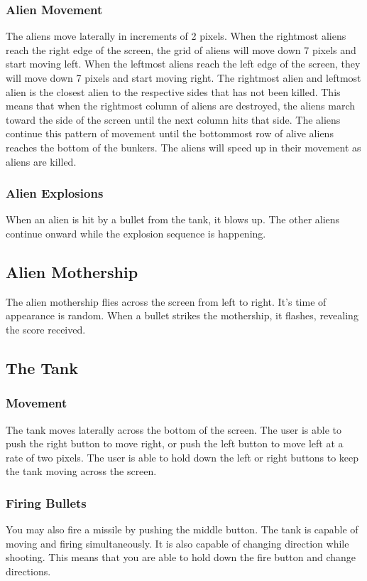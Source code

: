\documentclass[11pt,letter,oneside]{report}
\begin{document}
\subsubsection{Alien Movement}
The aliens move laterally in increments of 2 pixels.  When the rightmost aliens reach the right edge of the screen, the grid of aliens will move down 7 pixels and start moving left.  When the leftmost aliens reach the left edge of the screen, they will move down 7 pixels and start moving right.  The rightmost alien and leftmost alien is the closest alien to the respective sides that has not been killed. This means that when the rightmost column of aliens are destroyed, the aliens march toward the side of the screen until the next column hits that side. The aliens continue this pattern of movement until the bottommost row of alive aliens reaches the bottom of the bunkers. The aliens will speed up in their movement as aliens are killed.

\subsubsection{Alien Explosions}
When an alien is hit by a bullet from the tank, it blows up.  The other aliens continue onward while the explosion sequence is happening.

\subsection{Alien Mothership}
The alien mothership flies across the screen from left to right. It's time of appearance is random. When a bullet strikes the mothership, it flashes, revealing the score received.

\subsection{The Tank}
\subsubsection{Movement}
The tank moves laterally across the bottom of the screen. The user is able to push the right button to move right, or push the left button to move left at a rate of two pixels. The user is able to hold down the left or right buttons to keep the tank moving across the screen.
\subsubsection{Firing Bullets}
You may also fire a missile by pushing the middle button. The tank is capable of moving and firing simultaneously. It is also capable of changing direction while shooting. This means that you are able to hold down the fire button and change directions.
\end{document}
